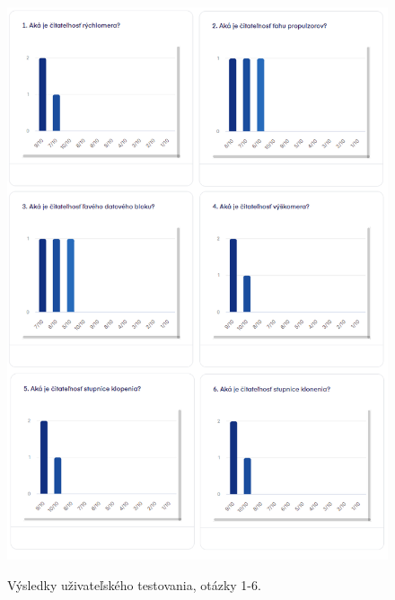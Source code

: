 \begin{figure}[ht]
\centering
\includegraphics[scale=0.65]{obrazky-figures/dotaznik1.1n.png}
\caption{Výsledky uživateľského testovania, otázky 1-6.}{\label{dotaznik1.1}}
\end{figure}

